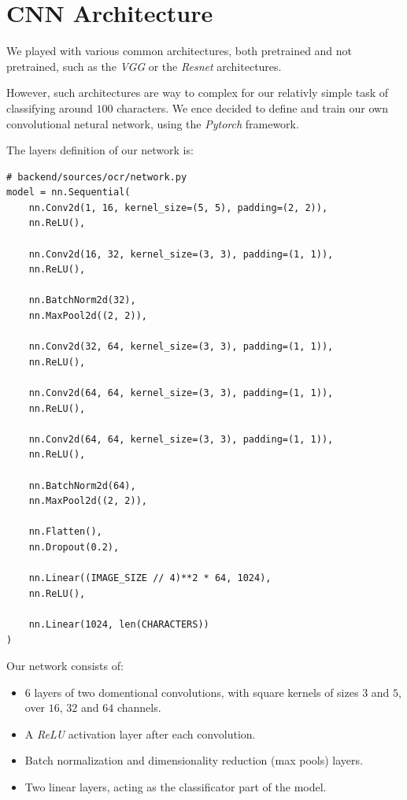 \documentclass[12pt, a4paper]{report}
\begin{document}
\section{CNN Architecture}

We played with various common architectures, both pretrained and not pretrained, such as the \textit{VGG}\cite{VGG} or the \textit{Resnet}\cite{resnet} architectures.

However, such architectures are way to complex for our relativly simple task of classifying around $100$ characters. We ence decided to define and train our own convolutional netural network, using the \textit{Pytorch} framework.

The layers definition of our network is:

\begin{verbatim}
# backend/sources/ocr/network.py
model = nn.Sequential(
    nn.Conv2d(1, 16, kernel_size=(5, 5), padding=(2, 2)),
    nn.ReLU(),
    
    nn.Conv2d(16, 32, kernel_size=(3, 3), padding=(1, 1)),
    nn.ReLU(),
    
    nn.BatchNorm2d(32),
    nn.MaxPool2d((2, 2)),
    
    nn.Conv2d(32, 64, kernel_size=(3, 3), padding=(1, 1)),
    nn.ReLU(),
    
    nn.Conv2d(64, 64, kernel_size=(3, 3), padding=(1, 1)),
    nn.ReLU(),
    
    nn.Conv2d(64, 64, kernel_size=(3, 3), padding=(1, 1)),
    nn.ReLU(),

    nn.BatchNorm2d(64),
    nn.MaxPool2d((2, 2)),

    nn.Flatten(),
    nn.Dropout(0.2),

    nn.Linear((IMAGE_SIZE // 4)**2 * 64, 1024),
    nn.ReLU(),

    nn.Linear(1024, len(CHARACTERS))
)
\end{verbatim}

Our network consists of:
\begin{itemize}
	\item $6$ layers of two domentional convolutions, with square kernels of sizes $3$ and $5$, over $16$, $32$ and $64$ channels.
	\item A \textit{ReLU}\cite{ReLU} activation layer after each convolution.
	\item Batch normalization and dimensionality reduction (max pools) layers.
	\item Two linear layers, acting as the classificator part of the model.
\end{itemize}
\end{document}
